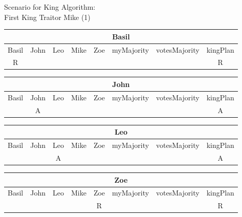 \begin{wideslide}[bm=,toc=]{\large Scenario for King Algorithm:\\First King Traitor Mike (1)}
\vspace*{2ex}
\begin{center}
\begin{paenv}

\begin{tabular}{|c|c|c|c|c||c|c|c|}
\hline
\multicolumn{8}{|c|}{Basil}\\\hline
Basil & John & Leo & Mike & Zoe & myMajority & votesMajority & kingPlan \\\hline
R&&&&&&&R\\\hline
\end{tabular}
\smallskip

\begin{tabular}{|c|c|c|c|c||c|c|c|}
\hline
\multicolumn{8}{|c|}{John}\\\hline
Basil & John & Leo & Mike & Zoe & myMajority & votesMajority & kingPlan \\\hline
&A&&&&&&A\\\hline
\end{tabular}
\smallskip

\begin{tabular}{|c|c|c|c|c||c|c|c|}
\hline
\multicolumn{8}{|c|}{Leo}\\\hline
Basil & John & Leo & Mike & Zoe & myMajority & votesMajority & kingPlan \\\hline
&&A&&&&&A\\\hline
\end{tabular}
\smallskip

\begin{tabular}{|c|c|c|c|c||c|c|c|}
\hline
\multicolumn{8}{|c|}{Zoe}\\\hline
Basil & John & Leo & Mike & Zoe & myMajority & votesMajority & kingPlan \\\hline
&&&&R&&&R\\\hline
\end{tabular}
\end{paenv}
\end{center}
\end{wideslide}

